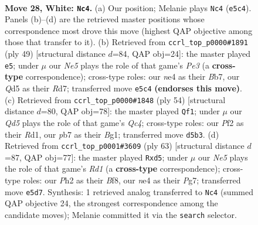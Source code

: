 \documentclass[11pt]{article}
\begin{document}
\clearpage

\begin{figure}[p]\centering
\begin{subfigure}{0.46\textwidth}\centering
\resizebox{\linewidth}{!}{%
\newchessgame
\chessboard[
  setfen={r1b3k1/1p2q2p/4r3/pR1QNpp1/4n3/4P1P1/P4PKP/B3R3 w - - 4 28},
  showmover=false,
  pgfstyle=straightmove, color=movearrow, markmove={e5-c4}
]}
\caption{}
\end{subfigure}\hfill
\begin{subfigure}{0.46\textwidth}\centering
\resizebox{\linewidth}{!}{%
\newchessgame
\chessboard[
  setfen={8/pb1rqpk1/1p2p1p1/7p/3Nn3/P3PB1P/1P3PP1/3RQ1K1 b - - 5 25},
  showmover=false,
  pgfstyle=straightmove, color=movearrow, markmove={e6-e5}
]}
\caption{}
\end{subfigure}
\\[4pt]
\begin{subfigure}{0.46\textwidth}\centering
\resizebox{\linewidth}{!}{%
\newchessgame
\chessboard[
  setfen={1rq1r1k1/p4pp1/7p/2b5/P1QN1n2/2P1p3/1P4PP/3RR1BK w - - 4 28},
  showmover=false,
  pgfstyle=straightmove, color=movearrow, markmove={c4-f1}
]}
\caption{}
\end{subfigure}\hfill
\begin{subfigure}{0.46\textwidth}\centering
\resizebox{\linewidth}{!}{%
\newchessgame
\chessboard[
  setfen={2rr1b1k/1q4p1/p4p1p/1pPRnP2/4Q3/1PN1B2P/P5PK/5R2 b - - 2 32},
  showmover=false,
  pgfstyle=straightmove, color=movearrow, markmove={d8-d5}
]}
\caption{}
\end{subfigure}
\caption{\textbf{Move 28, White: \texttt{Nc4}.} (a) Our position; Melanie plays \texttt{Nc4} (\texttt{e5c4}). Panels (b)--(d) are the retrieved master positions whose correspondence most drove this move (highest QAP objective among those that transfer to it). (b) Retrieved from \texttt{ccrl\_top\_p0000\#1891} (ply 49) [structural distance $d$=84, QAP obj=24]: the master played \texttt{e5}; under $\mu$ our \emph{Ne5} plays the role of that game's \emph{Pe3} (a \textbf{cross-type} correspondence); cross-type roles: our \emph{n}e4 as their \emph{B}b7, our \emph{Q}d5 as their \emph{R}d7; transferred move \texttt{e5c4} \textbf{(endorses this move)}. (c) Retrieved from \texttt{ccrl\_top\_p0000\#1848} (ply 54) [structural distance $d$=80, QAP obj=78]: the master played \texttt{Qf1}; under $\mu$ our \emph{Qd5} plays the role of that game's \emph{Qc4}; cross-type roles: our \emph{P}f2 as their \emph{R}d1, our \emph{p}b7 as their \emph{B}g1; transferred move \texttt{d5b3}. (d) Retrieved from \texttt{ccrl\_top\_p0001\#3609} (ply 63) [structural distance $d$=87, QAP obj=77]: the master played \texttt{Rxd5}; under $\mu$ our \emph{Ne5} plays the role of that game's \emph{Rd1} (a \textbf{cross-type} correspondence); cross-type roles: our \emph{P}h2 as their \emph{B}f8, our \emph{n}e4 as their \emph{P}g7; transferred move \texttt{e5d7}. Synthesis: 1 retrieved analog transferred to \texttt{Nc4} (summed QAP objective 24, the strongest correspondence among the candidate moves); Melanie committed it via the \texttt{search} selector.}
\label{fig:thought-m54}
\end{figure}
\end{document}
